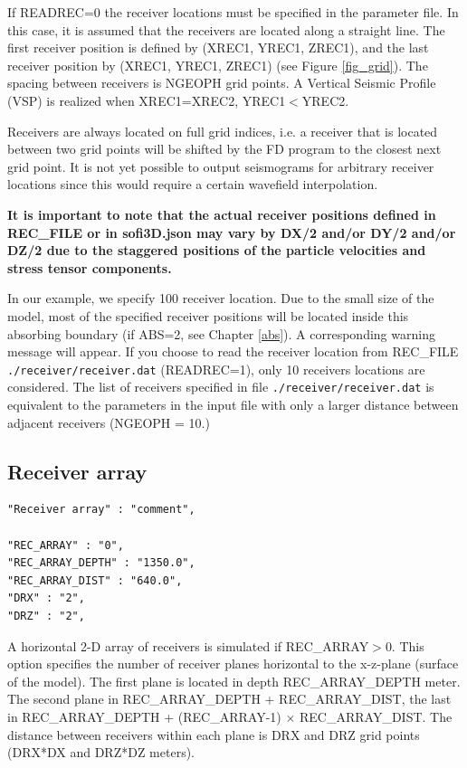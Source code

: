 \documentclass{hitec}
\begin{document}
If READREC=0 the receiver locations must be specified in the parameter file. In this case, it is assumed that the receivers are located along a straight line. The first receiver position is defined by (XREC1, YREC1, ZREC1), and the last receiver position by (XREC1, YREC1, ZREC1) (see Figure \ref{fig_grid}). The spacing between receivers is NGEOPH grid points.  A Vertical Seismic Profile (VSP)
is realized when XREC1=XREC2, YREC1$<$YREC2.  

Receivers are always located on full grid indices, i.e. a receiver that is located between two grid points will be shifted by the FD program to the closest next grid point. It is not yet possible
to output seismograms for arbitrary receiver locations since this would require a certain wavefield interpolation.

\textbf{It is important to note that the actual receiver positions defined in REC\_FILE or in sofi3D.json may vary by DX/2 and/or DY/2 and/or DZ/2 due to the staggered positions of the particle velocities and stress tensor components. }

In our example, we specify 100 receiver location. Due to the small size of the model, most of the specified receiver positions will be located inside this absorbing boundary (if ABS=2, see Chapter \ref{abs}). A corresponding warning message will appear. If you choose to read the receiver location from REC\_FILE  \lstinline{./receiver/receiver.dat} (READREC=1), only 10 receivers locations are considered. The list of receivers specified in file  \lstinline{./receiver/receiver.dat} is equivalent to the parameters in the input file with only a larger distance between adjacent receivers (NGEOPH = 10.)

\subsection{Receiver array}
\begin{verbatim}
"Receiver array" : "comment",

"REC_ARRAY" : "0",
"REC_ARRAY_DEPTH" : "1350.0",
"REC_ARRAY_DIST" : "640.0", 
"DRX" : "2",
"DRZ" : "2",
\end{verbatim}

A horizontal 2-D array of receivers is simulated if REC\_ARRAY$>$0. This option specifies the number of receiver planes horizontal to the x-z-plane (surface of the model). The first plane is located in depth REC\_ARRAY\_DEPTH meter. The second plane in REC\_ARRAY\_DEPTH + REC\_ARRAY\_DIST, the last in REC\_ARRAY\_DEPTH + (REC\_ARRAY-1) $\times$ REC\_ARRAY\_DIST. The distance between receivers within each plane is DRX and DRZ grid points (DRX*DX and DRZ*DZ meters).
\end{document}
